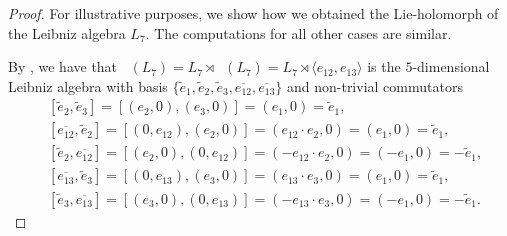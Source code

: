 \documentclass[11pt,a4paper]{amsart}
\theoremstyle{plain}
\theoremstyle{definition}
\theoremstyle{remark}
\numberwithin{equation}{section}
\newcommand{\0}{\emptyset}
\DeclareMathOperator{\DerL}{Der_{Lie}}
\DeclareMathOperator{\holL}{hol_{Lie}}
\newcommand{\ov}[1]{\overline{#1}}
\begin{document}
\begin{proof}
	For illustrative purposes, we show how we obtained the Lie-holomorph of the Leibniz algebra $L_7$. The computations for all other cases are similar. 
	
	By , we have that
	$\holL(L_7)=L_7 \rtimes \DerL(L_7)=L_7 \rtimes \langle e_{12}, e_{13} \rangle$ is the $5$-dimensional Leibniz algebra with basis $\lbrace \widetilde{e}_1,\widetilde{e}_2,\widetilde{e}_3,\ov{e_{12}}, \ov{e_{13}} \rbrace$ and non-trivial commutators
	\begin{align*}
		  & \left[\widetilde{e}_2,\widetilde{e}_3\right]=\left[(e_2,0),(e_3,0)\right]=(e_1,0)=\widetilde{e}_1,                         \\
		  & \left[\ov{e_{12}},\widetilde{e}_2\right] = \left[(0,e_{12}),(e_2,0)\right]=(e_{12} \cdot e_2,0)=(e_1,0)=\widetilde{e}_1,   \\
		  & \left[\widetilde{e}_2,\ov{e_{12}}\right] = \left[(e_2,0),(0,e_{12})\right]=(-e_{12}\cdot e_2,0)=(-e_1,0)=-\widetilde{e}_1, \\
		  & \left[\ov{e_{13}},\widetilde{e}_3\right] = \left[(0,e_{13}),(e_3,0)\right]=(e_{13} \cdot e_3,0)=(e_1,0)=\widetilde{e}_1,   \\
		  & \left[\widetilde{e}_3,\ov{e_{13}}\right] = \left[(e_3,0),(0,e_{13})\right]=(-e_{13}\cdot e_3,0)=(-e_1,0)=-\widetilde{e}_1. 
	\end{align*}
\end{proof}
\end{document}
